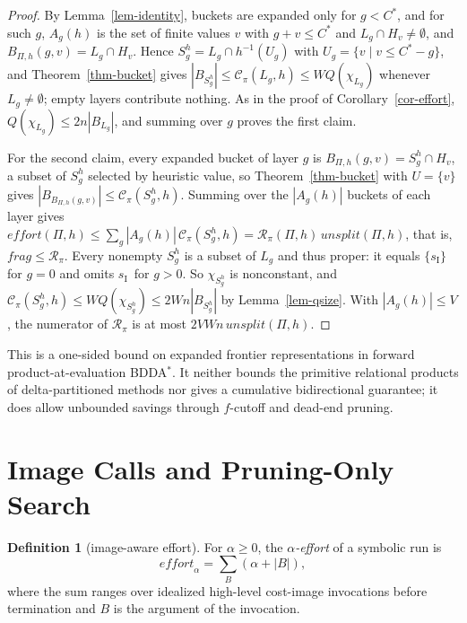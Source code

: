 \documentclass[letterpaper]{article}
\newcommand{\task}{\ensuremath{\Pi}}
\newcommand{\sinit}{\ensuremath{s_{\mathrm{I}}}}
\newcommand{\copt}{\ensuremath{C^{*}}}
\newcommand{\bddsize}[1]{\ensuremath{|B_{#1}|}}
\newcommand{\cofcount}{\ensuremath{Q}}
\newcommand{\cutprod}[2]{\ensuremath{\mathcal{C}_{\pi}(#1,#2)}}
\newcommand{\values}{\ensuremath{V}}
\newcommand{\level}[2]{\ensuremath{H_{#2}}}
\newcommand{\effort}{\ensuremath{\mathit{effort}}}
\newcommand{\unioneffort}{\ensuremath{\mathit{unsplit}}}
\newcommand{\fragfactor}{\ensuremath{\mathit{frag}}}
\newcommand{\profilescore}{\ensuremath{\mathcal{R}_{\pi}}}
\newcommand{\bddastar}{BDDA\ensuremath{^{*}}}
\theoremstyle{plain}
\theoremstyle{definition}
\newtheorem{definition}{Definition}
\theoremstyle{remark}
\begin{document}
\begin{proof}
By Lemma~\ref{lem-identity}, buckets are expanded only for $g<\copt$, and
for such $g$, $A_g(h)$ is the set of finite values $v$ with $g+v\leq\copt$
and $L_g\cap\level{h}{v}\ne\emptyset$, and $B_{\task,h}(g,v)=L_g\cap
\level{h}{v}$.  Hence $S_g^h=L_g\cap h^{-1}(U_g)$ with
$U_g=\{v\mid v\leq\copt-g\}$, and Theorem~\ref{thm-bucket} gives
$\bddsize{S_g^h}\leq\cutprod{L_g}{h}\leq W\cofcount(\chi_{L_g})$ whenever
$L_g\ne\emptyset$; empty layers contribute nothing.  As in the proof of
Corollary~\ref{cor-effort}, $\cofcount(\chi_{L_g})\leq2n\bddsize{L_g}$, and
summing over $g$ proves the first claim.

For the second claim, every expanded bucket of layer $g$ is
$B_{\task,h}(g,v)=S_g^h\cap\level{h}{v}$, a subset of $S_g^h$ selected by
heuristic value, so Theorem~\ref{thm-bucket} with $U=\{v\}$ gives
$\bddsize{B_{\task,h}(g,v)}\leq\cutprod{S_g^h}{h}$.  Summing over the
$|A_g(h)|$ buckets of each layer gives
$\effort(\task,h)\leq\sum_g|A_g(h)|\,\cutprod{S_g^h}{h}
=\profilescore(\task,h)\,\unioneffort(\task,h)$, that is,
$\fragfactor\leq\profilescore$.  Every nonempty $S_g^h$ is a subset of $L_g$
and thus proper: it equals $\{\sinit\}$ for $g=0$ and omits \sinit\ for
$g>0$.  So $\chi_{S_g^h}$ is nonconstant, and
$\cutprod{S_g^h}{h}\leq W\cofcount(\chi_{S_g^h})\leq2Wn\bddsize{S_g^h}$ by
Lemma~\ref{lem-qsize}.  With $|A_g(h)|\leq\values$, the numerator of
$\profilescore$ is at most $2\values Wn\,\unioneffort(\task,h)$.
\end{proof}

This is a one-sided bound on expanded frontier representations in forward
product-at-evaluation \bddastar. It neither bounds the primitive relational
products of delta-partitioned methods nor gives a cumulative bidirectional
guarantee; it does allow unbounded savings through $f$-cutoff and dead-end
pruning.

\section{Image Calls and Pruning-Only Search}

\begin{definition}[image-aware effort]
For $\alpha\geq0$, the \emph{$\alpha$-effort} of a symbolic run is
\[
 \effort_\alpha=\sum_B(\alpha+|B|),
\]
where the sum ranges over idealized high-level cost-image invocations before
termination and $B$ is the argument of the invocation.
\end{definition}
\end{document}
